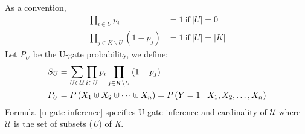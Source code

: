 \documentclass{article}
\numberwithin{equation}{section}
\numberwithin{figure}{section}
\numberwithin{table}{section}
\begin{document}
As a convention,
\begin{align*}
\prod_{i\in U}{p_i}&=1\ \mathrm{if}\ \left|U\right|=0\\
\prod_{j\in K\backslash U}{\left(1-p_j\right)}&=1\ \mathrm{if}\ \left|U\right|=\left|K\right|
\end{align*}
Let \textit{P${}_{U}$} be the U-gate probability, we define:
\begin{align*}
S_U&=\sum_{U\in \mathcal{U}}{\prod_{i\in U}{p_i}\prod_{j\in K\backslash U}{\left(1-p_j\right)}}\\
P_U&=P\left(X_1\uplus X_2\uplus \dots \uplus X_n\right)=P\left(Y=1\mathrel{\left|\vphantom{Y=1 X_1,X_2,\dots ,X_n}\right.\kern-\nulldelimiterspace}X_1,X_2,\dots ,X_n\right)
\end{align*}
Formula~\ref{u-gate-inference} specifies U-gate inference and cardinality of $\mathcal{U}$ where $\mathcal{U}$ is the set of subsets (\textit{U}) of \textit{K}.
\end{document}
